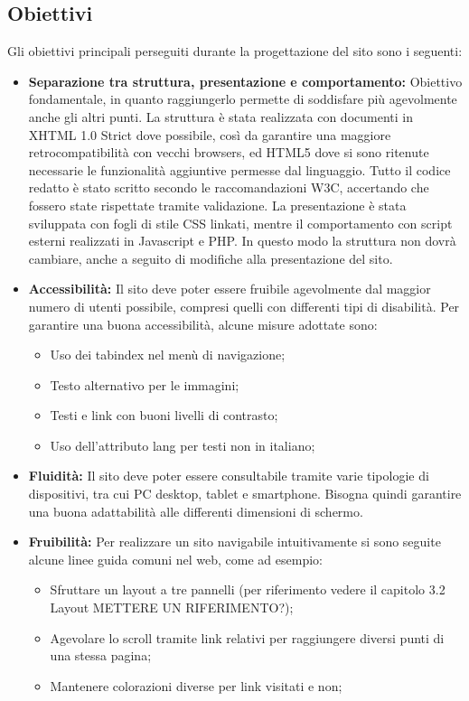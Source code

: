 \documentclass{article}
\begin{document}
		\subsection{Obiettivi}
		Gli obiettivi principali perseguiti durante la progettazione del sito sono i seguenti:
		\begin{itemize}
		    \item \textbf{Separazione tra struttura, presentazione e comportamento:}
		    Obiettivo fondamentale, in quanto raggiungerlo permette di soddisfare più agevolmente anche gli altri punti. 
		    La struttura è stata realizzata con documenti in XHTML 1.0 Strict dove possibile, così da garantire una maggiore retrocompatibilità con vecchi browsers, ed HTML5 dove si sono ritenute necessarie le funzionalità aggiuntive permesse dal linguaggio. Tutto il codice redatto è stato scritto secondo le raccomandazioni W3C, accertando che fossero state rispettate tramite validazione. 
		    La presentazione è stata sviluppata con fogli di stile CSS linkati, mentre il comportamento con script esterni realizzati in Javascript e PHP. In questo modo la struttura non dovrà cambiare, anche a seguito di modifiche alla presentazione del sito.
		    \item \textbf{Accessibilità:}
		    Il sito deve poter essere fruibile agevolmente dal maggior numero di utenti possibile, compresi quelli con differenti tipi di disabilità. Per garantire una buona accessibilità, alcune misure adottate sono:
		    \begin{itemize}
		        \item Uso dei tabindex nel menù di navigazione;
		        \item Testo alternativo per le immagini;
		        \item Testi e link con buoni livelli di contrasto;
		        \item Uso dell'attributo lang per testi non in italiano;
		    \end{itemize}
		    \item \textbf{Fluidità:}
		    Il sito deve poter essere consultabile tramite varie tipologie di dispositivi, tra cui PC desktop, tablet e smartphone. Bisogna quindi garantire una buona adattabilità alle differenti dimensioni di schermo.
		    \item \textbf{Fruibilità:}
		    Per realizzare un sito navigabile intuitivamente si sono seguite alcune linee guida comuni nel web, come ad esempio:
		    \begin{itemize}
		        \item Sfruttare un layout a tre pannelli (per riferimento vedere il capitolo 3.2 Layout METTERE UN RIFERIMENTO?);
		        \item Agevolare lo scroll tramite link relativi per raggiungere diversi punti di una stessa pagina;
		        \item Mantenere colorazioni diverse per link visitati e non;
		    \end{itemize}
		\end{itemize}
\end{document}
